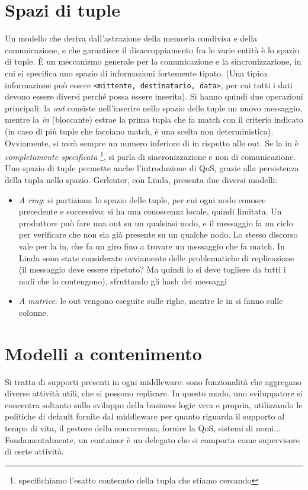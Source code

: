 \section{Spazi di tuple}
Un modello che deriva dall'astrazione della memoria condivisa e della comunicazione, e che garantisce il
disaccoppiamento fra le varie entità è lo spazio di tuple. È un meccanismo generale per la comunicazione e la
sincronizzazione, in cui si specifica uno spazio di informazioni fortemente tipato. (Una tipica informazione può essere
\texttt{<mittente, destinatario, data>}, per cui tutti i dati devono essere
diversi perché possa essere inserita).
Si hanno quindi due operazioni principali: la \textit{out} consiste nell'inserire nello spazio delle tuple un nuovo
messaggio, mentre la \textit{in} (bloccante) estrae la prima tupla che fa match
con il criterio indicato (in caso di più tuple che facciano match, è una scelta
non deterministica). Ovviamente, si avrà sempre un numero inferiore di in
rispetto alle out. Se la in è \textit{completamente specificata}
\footnote{specifichiamo l'esatto contenuto della tupla che stiamo cercando}, si
parla di sincronizzazione e non di comunicazione. Uno spazio di tuple permette
anche l'introduzione di QoS, grazie alla persistenza della tupla nello spazio.
Gerlenter, con Linda, presenta due diversi modelli:
\begin{itemize}
 \item \textit{A ring}: si partiziona lo spazio delle tuple, per cui ogni nodo conosce precedente e successivo: si ha
 una conoscenza locale, quindi limitata. Un produttore può fare una out su un qualsiasi nodo, e il messaggio fa un
 ciclo per verificare che non sia già presente su un qualche nodo. Lo stesso discorso vale per la in, che fa un giro
 fino a trovare un messaggio che fa match. In Linda sono state considerate ovviamente delle problematiche di
 replicazione (il messaggio deve essere ripetuto? Ma quindi lo si deve togliere da tutti i nodi che lo contengono),
 sfruttando gli hash dei messaggi
 \item \textit{A matrice}: le out vengono eseguite sulle righe, mentre le in si fanno sulle colonne.
\end{itemize}
\section{Modelli a contenimento}
Si tratta di supporti presenti in ogni middleware: sono funzionalità che aggregano diverse attività utili, che si
possono replicare. In questo modo, uno sviluppatore si concentra soltanto sullo sviluppo della business logic vera e
propria, utilizzando le politiche di default fornite dal middleware per quanto riguarda il supporto al tempo di vita,
il gestore della concorrenza, fornire la QoS, sistemi di nomi... Fondamentalmente, un container è un delegato che si
comporta come supervisore di certe attività.

